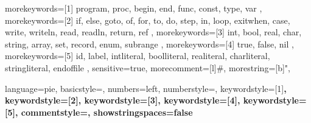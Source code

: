 {
    morekeywords={[1]
        program,
        proc,
        begin,
        end,
        func,
        const,
        type,
        var
    },
    morekeywords={[2]
        if,
        else,
        goto,
        of, %
        for,
        to, %
        do, %
        step, %
        in, %
        loop,
        exitwhen, %
        case,
        write,
        writeln,
        read,
        readln,
        return,
        ref
    },
    morekeywords={[3]
        int,
        bool,
        real,
        char,
        string,
        array,
        set,
        record,
        enum,
        subrange
    },
    morekeywords={[4]
        true, false, nil
    },
    morekeywords={[5]
        id,
        label,
        intliteral,
        boolliteral,
        realiteral,
        charliteral,
        stringliteral,
        endoffile
    },
    sensitive=true,
    morecomment=[l]{\#},
    morestring=[b]",
}



{
    language=pie,
    basicstyle=\ttfamily,
    numbers=left,
    numberstyle=\tiny,
    keywordstyle=[1]\bfseries\color{keywordcolor},
    keywordstyle=[2]\bfseries\color{keywordcolor},
    keywordstyle=[3]\bfseries\color{keywordcolor},
    keywordstyle=[4]\bfseries\color{literalcolor},
    keywordstyle=[5]\bfseries\color{todefine},
    commentstyle=\color{commentcolor},
    showstringspaces=false
}

\lstset{style=pie}

%
